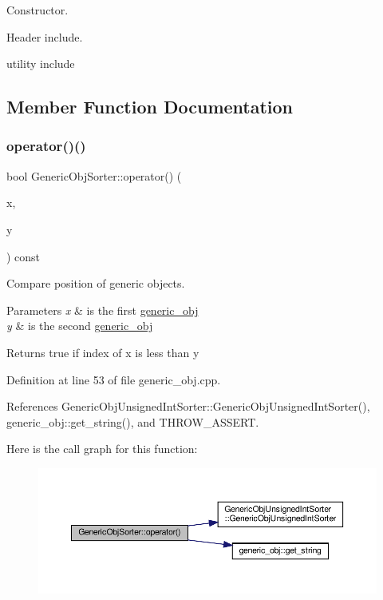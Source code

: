 Constructor. 

Header include.

utility include 

\subsection{Member Function Documentation}
\mbox{\label{classGenericObjSorter_a1ed342b14ada0fb75b19d08ee042f869}} 
\subsubsection{\texorpdfstring{operator()()}{operator()()}}
{\footnotesize\ttfamily bool Generic\+Obj\+Sorter\+::operator() (\begin{DoxyParamCaption}\item[{const \hyperlink{generic__obj_8hpp_acb533b2ef8e0fe72e09a04d20904ca81}{generic\+\_\+obj\+Ref} \&}]{x,  }\item[{const \hyperlink{generic__obj_8hpp_acb533b2ef8e0fe72e09a04d20904ca81}{generic\+\_\+obj\+Ref} \&}]{y }\end{DoxyParamCaption}) const}



Compare position of generic objects. 


\begin{DoxyParams}{Parameters}
{\em x} & is the first \hyperlink{classgeneric__obj}{generic\+\_\+obj} \\
\hline
{\em y} & is the second \hyperlink{classgeneric__obj}{generic\+\_\+obj} \\
\hline
\end{DoxyParams}
\begin{DoxyReturn}{Returns}
true if index of x is less than y 
\end{DoxyReturn}


Definition at line 53 of file generic\+\_\+obj.\+cpp.



References Generic\+Obj\+Unsigned\+Int\+Sorter\+::\+Generic\+Obj\+Unsigned\+Int\+Sorter(), generic\+\_\+obj\+::get\+\_\+string(), and T\+H\+R\+O\+W\+\_\+\+A\+S\+S\+E\+RT.

Here is the call graph for this function\+:
\nopagebreak
\begin{figure}[H]
\begin{center}
\leavevmode
\includegraphics[width=350pt]{d8/df8/classGenericObjSorter_a1ed342b14ada0fb75b19d08ee042f869_cgraph}
\end{center}
\end{figure}


